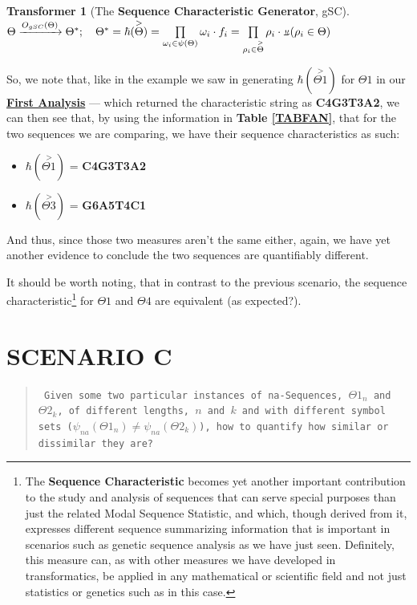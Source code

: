 \documentclass[a4paper, 18pt]{book} %
\newtheorem{transf}{Transformer}
\newcommand{\invpi}{\rotatebox[origin=c]{180}{$\pi$}}
\begin{document}
\begin{transf}[The \textbf{Sequence Characteristic Generator}, gSC]
\label{TRANSFGENSEQCHAR}
$ $\\
$\Theta \xrightarrow{O_{gSC}(\Theta)} \Theta^*; \quad \Theta^* = \hbar(\overset{>}{\Theta}) = \prod\limits_{\omega_i \in \psi(\Theta)} \omega_i\cdot f_i = \prod\limits_{\rho_i \in \overset{>}{\Theta}} \rho_i\cdot \invpi(\rho_i \in \Theta)$
\end{transf}

So, we note that, like in the example we saw in generating $\hbar(\overset{>}{\Theta1})$ for $\Theta1$ in our \textbf{\hyperref[SECFANAL]{First Analysis}} --- which returned the characteristic string as \textbf{C4G3T3A2}, we can then see that, by using the information in \textbf{Table \ref{TABFAN}}, that for the two sequences we are comparing, we have their sequence characteristics as such:

\begin{itemize}
\item $\hbar(\overset{>}{\Theta1})$ = \textbf{C4G3T3A2}
\item $\hbar(\overset{>}{\Theta3})$ = \textbf{G6A5T4C1}
\end{itemize}

And thus, since those two measures aren't the same either, again, we have yet another evidence to conclude the two sequences are quantifiably different.

It should be worth noting, that in contrast to the previous scenario, the sequence characteristic\footnote{The \textbf{Sequence Characteristic} becomes yet another important contribution to the study and analysis of sequences that can serve special purposes than just the related Modal Sequence Statistic, and which, though derived from it, expresses different sequence summarizing information that is important in scenarios such as genetic sequence analysis as we have just seen. Definitely, this measure can, as with other measures we have developed in transformatics, be applied in any mathematical or scientific field and not just statistics or genetics such as in this case.} for $\Theta1$ and $\Theta4$ are equivalent (as expected?).

\section{SCENARIO C}
\label{SECSCENC}

\begin{quote}
\small
\texttt{
Given some two particular instances of na-Sequences, $\Theta1_n$ and $\Theta2_k$, of different lengths, $n$ and $k$ and with different symbol sets ($\psi_{na}(\Theta1_n) \neq \psi_{na}(\Theta2_k)$), how to quantify how similar or dissimilar they are?}
\end{quote}
\end{document}
